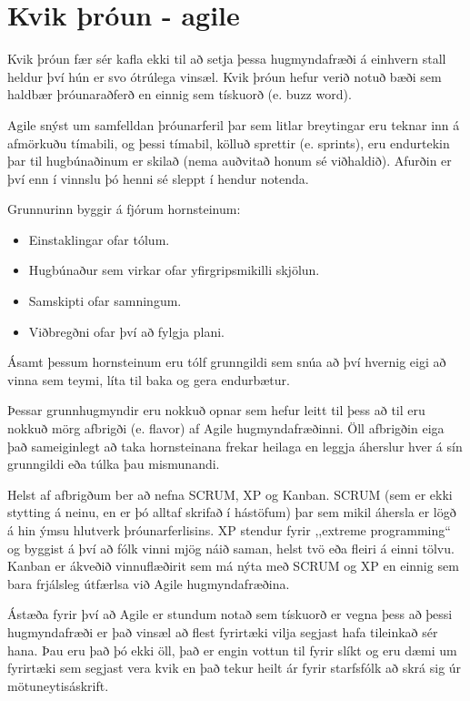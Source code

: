 \section{Kvik þróun - agile}
Kvik þróun fær sér kafla ekki til að setja þessa hugmyndafræði á einhvern stall heldur því hún er svo ótrúlega vinsæl.
Kvik þróun hefur verið notuð bæði sem haldbær þróunaraðferð en einnig sem tískuorð (e. buzz word).

Agile snýst um samfelldan þróunarferil þar sem litlar breytingar eru teknar inn á afmörkuðu tímabili, og þessi tímabil, kölluð sprettir (e. sprints), eru endurtekin þar til hugbúnaðinum er skilað (nema auðvitað honum sé viðhaldið).
Afurðin er því enn í vinnslu þó henni sé sleppt í hendur notenda.

Grunnurinn byggir á fjórum hornsteinum:
\begin{itemize}
	\item Einstaklingar ofar tólum.
	\item Hugbúnaður sem virkar ofar yfirgripsmikilli skjölun.
	\item Samskipti ofar samningum.
	\item Viðbregðni ofar því að fylgja plani.
\end{itemize}

Ásamt þessum hornsteinum eru tólf grunngildi sem snúa að því hvernig eigi að vinna sem teymi, líta til baka og gera endurbætur.

Þessar grunnhugmyndir eru nokkuð opnar sem hefur leitt til þess að til eru nokkuð mörg afbrigði (e. flavor) af Agile hugmyndafræðinni.
Öll afbrigðin eiga það sameiginlegt að taka hornsteinana frekar heilaga en leggja áherslur hver á sín grunngildi eða túlka þau mismunandi.

Helst af afbrigðum ber að nefna SCRUM, XP og Kanban.
SCRUM (sem er ekki stytting á neinu, en er þó alltaf skrifað í hástöfum) þar sem mikil áhersla er lögð á hin ýmsu hlutverk þróunarferlisins.
XP stendur fyrir ,,extreme programming“ og byggist á því að fólk vinni mjög náið saman, helst tvö eða fleiri á einni tölvu.
Kanban er ákveðið vinnuflæðirit sem má nýta með SCRUM og XP en einnig sem bara frjálsleg útfærlsa við Agile hugmyndafræðina.

Ástæða fyrir því að Agile er stundum notað sem tískuorð er vegna þess að þessi hugmyndafræði er það vinsæl að flest fyrirtæki vilja segjast hafa tileinkað sér hana.
Þau eru það þó ekki öll, það er engin vottun til fyrir slíkt og eru dæmi um fyrirtæki sem segjast vera kvik en það tekur heilt ár fyrir starfsfólk að skrá sig úr mötuneytisáskrift.


